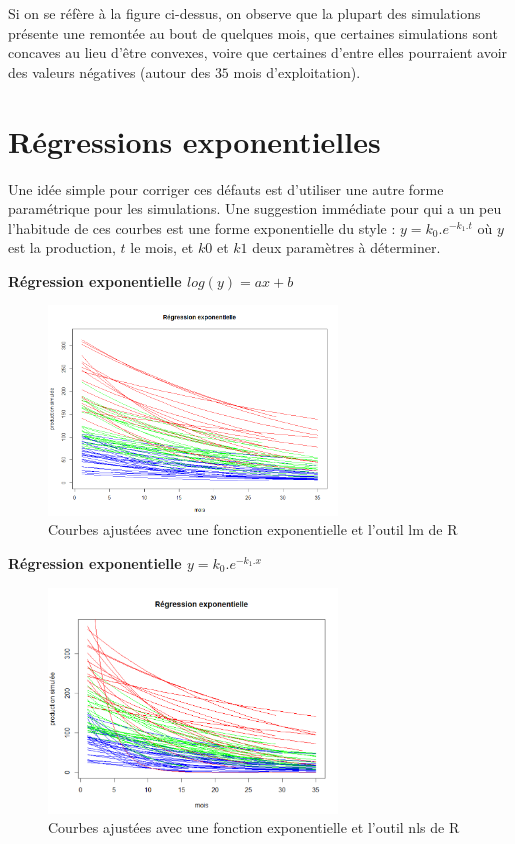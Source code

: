 \documentclass[12pt]{article}
\begin{document}
Si on se r\'ef\`ere \`a la figure ci-dessus, on observe que la plupart des simulations
pr\'esente une remont\'ee au bout de quelques mois, que certaines simulations sont concaves
au lieu d'\^etre convexes, voire que certaines d'entre elles pourraient avoir des valeurs n\'egatives (autour des $35$ mois d'exploitation).

\newpage


\section{R\'egressions exponentielles}

Une id\'ee simple pour corriger ces d\'efauts est d'utiliser une autre forme param\'etrique pour
les simulations. Une suggestion imm\'ediate pour qui a un peu l'habitude de ces courbes est
une forme exponentielle du style : $y=k_{0}.e^{-k_{1}.t}$ où $y$ est la production, $t$ le mois, et $k0$ et
$k1$ deux param\`etres \`a d\'eterminer.

\textbf{R\'egression exponentielle $log(y)=ax+b$}

\begin{figure}[H]
 \centering %
	\includegraphics[width=290px]{reg_exp_1}
  \caption{\label{fig:exponential_reg_lm} Courbes ajust\'ees avec une fonction exponentielle et l'outil lm de R}
\end{figure}


\textbf{R\'egression exponentielle $y=k_{0}.e^{-k_{1}.x}$}

\begin{figure}[H]
 \centering %
	\includegraphics[width=290px]{reg_exp_2}
  \caption{\label{fig:exponential_reg_nls} Courbes ajust\'ees avec une fonction exponentielle et l'outil nls de R}
\end{figure}
\end{document}
